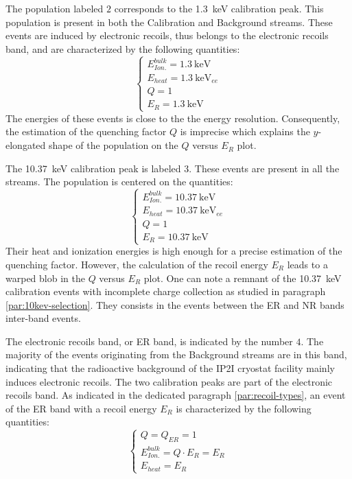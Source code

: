 The population labeled $2$ corresponds to the \SI{1.3}{\kilo\eV} calibration peak. This population is present in both the Calibration and Background streams. These events are induced by electronic recoils, thus belongs to the electronic recoils band, and are characterized by the following quantities:
\begin{equation}
\begin{cases}
E_{Ion.}^{bulk} = \SI{1.3}{\kilo\eV} \\
E_{heat} = \SI{1.3}{\kilo\eV}_{ee} \\
Q = 1 \\
E_R = \SI{1.3}{\kilo\eV}
\end{cases}
\end{equation}
The energies of these events is close to the the energy resolution. Consequently, the estimation of the quenching factor $Q$ is imprecise which explains the $y$-elongated shape of the population on the $Q$ versus $E_R$ plot.

The \SI{10.37}{\kilo\eV} calibration peak is labeled $3$. These events are present in all the streams. The population is centered on the quantities:
\begin{equation}
\begin{cases}
E_{Ion.}^{bulk} = \SI{10.37}{\kilo\eV} \\
E_{heat} = \SI{10.37}{\kilo\eV}_{ee} \\
Q = 1 \\
E_R = \SI{10.37}{\kilo\eV}
\end{cases}
\end{equation}
Their heat and ionization energies is high enough for a precise estimation of the quenching factor. However, the calculation of the recoil energy $E_R$ leads to a warped blob in the $Q$ versus $E_R$ plot. 
One can note a remnant of the \SI{10.37}{\kilo\eV} calibration events with incomplete charge collection as studied in paragraph \ref{par:10kev-selection}. They consists in the events between the ER and NR bands inter-band events.

The electronic recoils band, or ER band, is indicated by the number $4$. The majority of the events originating from the Background streams are in this band, indicating that the radioactive background of the IP2I cryostat facility mainly induces electronic recoils. The two calibration peaks are part of the electronic recoils band. As indicated in the dedicated paragraph \ref{par:recoil-types}, an event of the ER band with a recoil energy $E_R$ is characterized by the following quantities:
\begin{equation}
\label{eq:er-band}
\begin{cases}
Q = Q_{ER} = 1 \\
E_{Ion.}^{bulk} = Q \cdot E_R = E_R \\
E_{heat} = E_R
\end{cases}
\end{equation}

